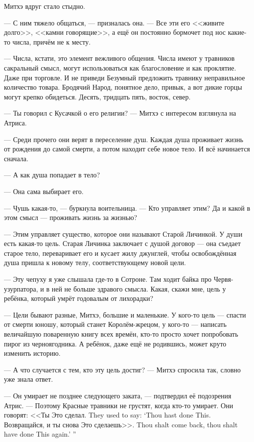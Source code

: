 Митхэ вдруг стало стыдно.

--- С ним тяжело общаться, --- призналась она.
--- Все эти его <<живите долго>>, <<камни говорящие>>, а ещё он постоянно бормочет под нос какие-то числа, причём не к месту.

--- Числа, кстати, это элемент вежливого общения.
Числа имеют у травников сакральный смысл, могут использоваться как благословение и как проклятие.
Даже при торговле.
И не приведи Безумный предложить травнику неправильное количество товара.
Бродячий Народ, понятное дело, привык, а вот дикие горцы могут крепко обидеться.
Десять, тридцать пять, восток, север.

--- Ты говорил с Кусачкой о его религии? --- Митхэ с интересом взглянула на Атриса.

--- Среди прочего они верят в переселение душ.
Каждая душа проживает жизнь от рождения до самой смерти, а потом находит себе новое тело.
И всё начинается сначала.

--- А как душа попадает в тело?

--- Она сама выбирает его.

--- Чушь какая-то, --- буркнула воительница.
--- Кто управляет этим?
Да и какой в этом смысл --- проживать жизнь за жизнью?

--- Этим управляет существо, которое они называют Старой Личинкой.
У души есть какая-то цель.
Старая Личинка заключает с душой договор --- она съедает старое тело, переваривает его и кусает жилу джунглей, чтобы освобождённая душа пришла к новому телу, соответствующему новой цели.

--- Эту чепуху я уже слышала где-то в Сотроне.
Там ходит байка про Червя-узурпатора, и в ней не больше здравого смысла.
Какая, скажи мне, цель у ребёнка, который умрёт годовалым от лихорадки?

--- Цели бывают разные, Митхэ, большие и маленькие.
У кого-то цель --- спасти от смерти юношу, который станет Королём-жрецом, у кого-то --- написать величайшую поваренную книгу всех времён, кто-то просто хочет попробовать пирог из черноягодника.
А ребёнок, даже ещё не родившись, может круто изменить историю.

--- А что случается с тем, кто эту цель достиг? --- Митхэ спросила так, словно уже знала ответ.

--- Он умирает не позднее следующего заката, --- подтвердил её подозрения Атрис.
--- Поэтому Красные травники не грустят, когда кто-то умирает.
{Они говорят: <<Ты Это сделал.}
{They used to say: `Thou hast done This.}
{Возвращайся, и ты снова Это сделаешь>>.}
{Thou shalt come back, thou shalt have done This again.' ''}

